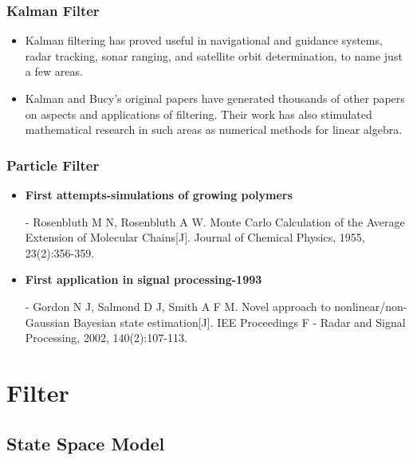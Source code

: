 \documentclass[14pt,hyperref={CJKbookmarks=true}]{beamer}
\theoremstyle{plain}
\theoremstyle{definition}
\theoremstyle{remark}
\begin{document}
\begin{frame}
\small \frametitle{Kalman Filter}
\begin{itemize}
\item Kalman filtering has proved useful in navigational and guidance systems, radar tracking, sonar ranging, and satellite orbit determination, to name just a few areas. 
\item Kalman and Bucy's original papers have generated thousands of other papers on aspects and applications of filtering. Their work has also stimulated mathematical research in such areas as numerical methods for linear algebra.
\end{itemize}
\end{frame}


\begin{frame}
\small \frametitle{Particle Filter}
\begin{itemize}
\item {\bf{First attempts-simulations of growing polymers}}
\item[-] Rosenbluth M N, Rosenbluth A W. Monte Carlo Calculation of the Average Extension of Molecular Chains[J]. Journal of Chemical Physics, 1955, 23(2):356-359.
\item {\bf{First application in signal processing-1993}}
\item[-] Gordon N J, Salmond D J, Smith A F M. Novel approach to nonlinear/non-Gaussian Bayesian state estimation[J]. IEE Proceedings F - Radar and Signal Processing, 2002, 140(2):107-113.
\end{itemize}
\end{frame}



\section{Filter}
\frame{\tableofcontents[currentsection]}

\subsection{State Space Model}
\end{document}
